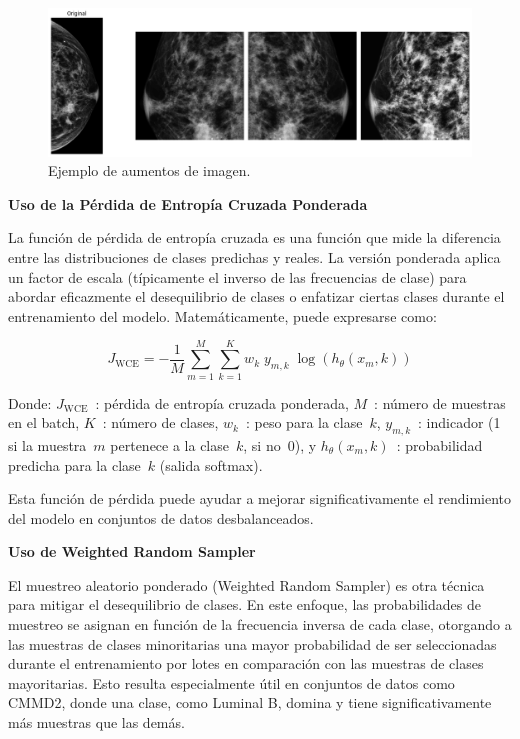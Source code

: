 \documentclass[a4paper,10pt]{book}
\begin{document}
\begin{figure}[h!]
\centering
\includegraphics[width=0.8\linewidth]{reports//assets/augmentations.png}
\caption[Aumentos de imagen]{Ejemplo de aumentos de imagen.}
\label{fig:augmentations}
\end{figure}


\textbf{Uso de la Pérdida de Entropía Cruzada Ponderada}

La función de pérdida de entropía cruzada es una función que mide la diferencia entre las distribuciones de clases predichas y reales. La versión ponderada aplica un factor de escala (típicamente el inverso de las frecuencias de clase) para abordar eficazmente el desequilibrio de clases o enfatizar ciertas clases durante el entrenamiento del modelo. Matemáticamente, puede expresarse como:

\begin{equation}
J_{\text{WCE}} = -\frac{1}{M} \sum_{m=1}^{M} \sum_{k=1}^{K} w_k \; y_{m,k} \; \log\left( h_\theta(x_m, k) \right)
\end{equation}

Donde: $J_{\text{WCE}}$~: pérdida de entropía cruzada ponderada, $M$~: número de muestras en el batch, $K$~: número de clases, $w_k$~: peso para la clase~$k$, $y_{m,k}$~: indicador (1 si la muestra~$m$ pertenece a la clase~$k$, si no~0), y $h_\theta(x_m, k)$~: probabilidad predicha para la clase~$k$ (salida softmax).

Esta función de pérdida puede ayudar a mejorar significativamente el rendimiento del modelo en conjuntos de datos desbalanceados.

\textbf{Uso de Weighted Random Sampler}

El muestreo aleatorio ponderado (Weighted Random Sampler) es otra técnica para mitigar el desequilibrio de clases. En este enfoque, las probabilidades de muestreo se asignan en función de la frecuencia inversa de cada clase, otorgando a las muestras de clases minoritarias una mayor probabilidad de ser seleccionadas durante el entrenamiento por lotes en comparación con las muestras de clases mayoritarias. Esto resulta especialmente útil en conjuntos de datos como CMMD2, donde una clase, como Luminal B, domina y tiene significativamente más muestras que las demás.
\end{document}

